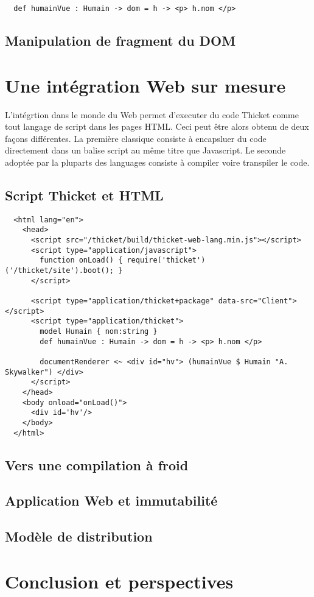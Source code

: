 \documentclass[twoside,a4paper]{article}
\begin{document}
\lstset{language=Thicket}
\begin{lstlisting}
  def humainVue : Humain -> dom = h -> <p> h.nom </p>
\end{lstlisting}

\subsection{Manipulation de fragment du DOM}

\section{Une intégration Web sur mesure}

L'intégrtion dans  le monde du  Web permet d'executer du  code Thicket
comme tout langage de script dans les pages HTML. Ceci peut être alors
obtenu de  deux façons différentes.  La première classique  consiste à
encapsluer du code directement dans un balise script au même titre que
Javascript. Le seconde adoptée par la pluparts des languages consiste 
à compiler voire transpiler le code.

\subsection{Script Thicket et HTML}

\lstset{language=Html}
\begin{lstlisting}
  <html lang="en">
    <head>
      <script src="/thicket/build/thicket-web-lang.min.js"></script>    
      <script type="application/javascript">
        function onLoad() { require('thicket')('/thicket/site').boot(); }
      </script>

      <script type="application/thicket+package" data-src="Client"></script>
      <script type="application/thicket">
        model Humain { nom:string }
        def humainVue : Humain -> dom = h -> <p> h.nom </p>

        documentRenderer <~ <div id="hv"> (humainVue $ Humain "A. Skywalker") </div>
      </script>
    </head>        
    <body onload="onLoad()">
      <div id='hv'/>
    </body>
  </html>
\end{lstlisting}



\subsection{Vers une compilation à froid}

\subsection{Application Web et immutabilité}

\subsection{Modèle de distribution}

\section{Conclusion et perspectives}



\end{document}
